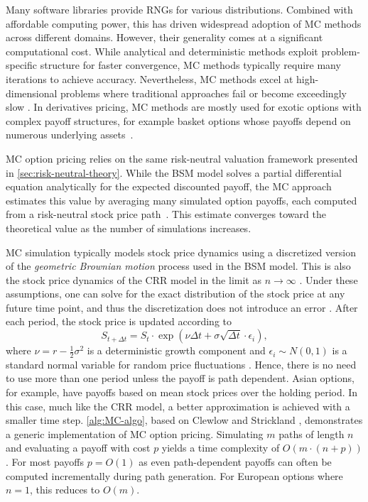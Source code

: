\documentclass[english,12pt,a4paper,pdftex,sci,utf8]{aaltothesis}
\begin{document}
Many software libraries provide RNGs for various distributions. Combined with affordable computing power, this has driven widespread adoption of MC methods across different domains. However, their generality comes at a significant computational cost. While analytical and deterministic methods exploit problem-specific structure for faster convergence, MC methods typically require many iterations to achieve accuracy. Nevertheless, MC methods excel at high-dimensional problems where traditional approaches fail or become exceedingly slow \cite{gentle2003random}. In derivatives pricing, MC methods are mostly used for exotic options with complex payoff structures, for example basket options whose payoffs depend on numerous underlying assets~\cite{hull2018,wilmott2013paul}.

MC option pricing relies on the same risk-neutral valuation framework presented in \cref{sec:risk-neutral-theory}. While the BSM model solves a partial differential equation analytically for the expected discounted payoff, the MC approach estimates this value by averaging many simulated option payoffs, each computed from a risk-neutral stock price path~\cite{boyle1977options}. This estimate converges toward the theoretical value as the number of simulations increases.

MC simulation typically models stock price dynamics using a discretized version of the \emph{geometric Brownian motion} process used in the BSM model. This is also the stock price dynamics of the CRR model in the limit as $n \rightarrow \infty$ \cite{cox1979option}. Under these assumptions, one can solve for the exact distribution of the stock price at any future time point, and thus the discretization does not introduce an error \cite{clewlow1998implementing}. After each period, the stock price is updated according to
\begin{equation*}
S_{t+\Delta t} = S_t \cdot \exp \left( \nu \Delta t + \sigma \sqrt{\Delta t} \cdot \epsilon_i \right),
\label{eq:GBM-price}
\end{equation*}
where $\nu=r-\frac{1}{2}\sigma^2$ is a deterministic growth component and $\epsilon_i \sim N(0,1)$ is a standard normal variable for random price fluctuations \cite{clewlow1998implementing}. Hence, there is no need to use more than one period unless the payoff is path dependent. Asian options, for example, have payoffs based on mean stock prices over the holding period. In this case, much like the CRR model, a better approximation is achieved with a smaller time step. \cref{alg:MC-algo}, based on Clewlow and Strickland \cite{clewlow1998implementing}, demonstrates a generic implementation of MC option pricing. Simulating $m$ paths of length $n$ and evaluating a payoff with cost $p$ yields a time complexity of $O(m \cdot (n+p))$. For most payoffs $p=O(1)$ as even path-dependent payoffs can often be computed incrementally during path generation. For European options where $n=1$, this reduces to $O(m)$.
\end{document}
